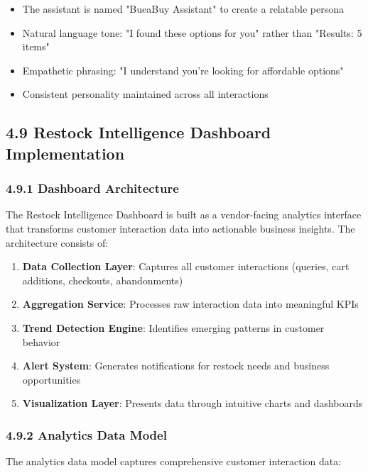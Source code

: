 \documentclass[12pt,a4paper]{article}
\begin{document}
\begin{itemize}
    \item The assistant is named "BueaBuy Assistant" to create a relatable persona
    \item Natural language tone: "I found these options for you" rather than "Results: 5 items"
    \item Empathetic phrasing: "I understand you're looking for affordable options"
    \item Consistent personality maintained across all interactions
\end{itemize}

\subsection{4.9 Restock Intelligence Dashboard Implementation}

\subsubsection{4.9.1 Dashboard Architecture}

The Restock Intelligence Dashboard is built as a vendor-facing analytics interface that transforms customer interaction data into actionable business insights. The architecture consists of:

\begin{enumerate}
    \item \textbf{Data Collection Layer}: Captures all customer interactions (queries, cart additions, checkouts, abandonments)
    \item \textbf{Aggregation Service}: Processes raw interaction data into meaningful KPIs
    \item \textbf{Trend Detection Engine}: Identifies emerging patterns in customer behavior
    \item \textbf{Alert System}: Generates notifications for restock needs and business opportunities
    \item \textbf{Visualization Layer}: Presents data through intuitive charts and dashboards
\end{enumerate}

\subsubsection{4.9.2 Analytics Data Model}

The analytics data model captures comprehensive customer interaction data:
\end{document}
